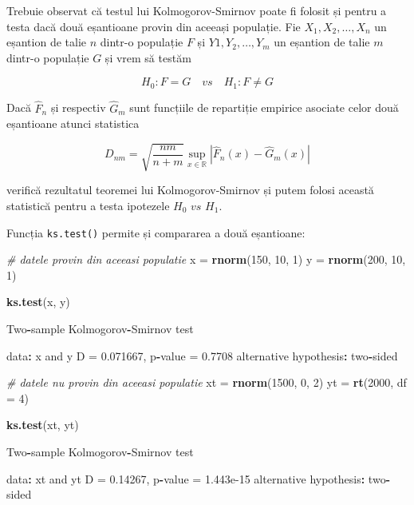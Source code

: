 \documentclass[]{article}
\newenvironment{Shaded}{\begin{snugshade}}{\end{snugshade}}
\newcommand{\KeywordTok}[1]{\textcolor[rgb]{0.13,0.29,0.53}{\textbf{#1}}}
\newcommand{\DataTypeTok}[1]{\textcolor[rgb]{0.13,0.29,0.53}{#1}}
\newcommand{\DecValTok}[1]{\textcolor[rgb]{0.00,0.00,0.81}{#1}}
\newcommand{\FloatTok}[1]{\textcolor[rgb]{0.00,0.00,0.81}{#1}}
\newcommand{\StringTok}[1]{\textcolor[rgb]{0.31,0.60,0.02}{#1}}
\newcommand{\CommentTok}[1]{\textcolor[rgb]{0.56,0.35,0.01}{\textit{#1}}}
\newcommand{\OperatorTok}[1]{\textcolor[rgb]{0.81,0.36,0.00}{\textbf{#1}}}
\newcommand{\NormalTok}[1]{#1}
\begin{document}
Trebuie observat că testul lui Kolmogorov-Smirnov poate fi folosit și
pentru a testa dacă două eșantioane provin din aceeași populație. Fie
\(X_1, X_2, \ldots, X_n\) un eșantion de talie \(n\) dintr-o populație
\(F\) și \(Y1, Y_2, \ldots, Y_m\) un eșantion de talie \(m\) dintr-o
populație \(G\) și vrem să testăm

\[
  H_0: F = G \quad vs\quad H_1: F\neq G
\]

Dacă \(\hat{F}_n\) și respectiv \(\hat{G}_m\) sunt funcțiile de
repartiție empirice asociate celor două eșantioane atunci statistica

\[
  D_{nm} = \sqrt{\frac{nm}{n+m}}\sup_{x\in\mathbb{R}}\left|\hat{F}_n(x) - \hat{G}_m(x)\right|
\]

verifică rezultatul teoremei lui Kolmogorov-Smirnov și putem folosi
această statistică pentru a testa ipotezele \(H_0\,\, vs\,\, H_1\).

Funcția \texttt{ks.test()} permite și compararea a două eșantioane:

\begin{Shaded}
\begin{Highlighting}[]
\CommentTok{# datele provin din aceeasi populatie}
\NormalTok{x =}\StringTok{ }\KeywordTok{rnorm}\NormalTok{(}\DecValTok{150}\NormalTok{, }\DecValTok{10}\NormalTok{, }\DecValTok{1}\NormalTok{)}
\NormalTok{y =}\StringTok{ }\KeywordTok{rnorm}\NormalTok{(}\DecValTok{200}\NormalTok{, }\DecValTok{10}\NormalTok{, }\DecValTok{1}\NormalTok{)}

\KeywordTok{ks.test}\NormalTok{(x, y)}

\NormalTok{    Two}\OperatorTok{-}\NormalTok{sample Kolmogorov}\OperatorTok{-}\NormalTok{Smirnov test}

\NormalTok{data}\OperatorTok{:}\StringTok{  }\NormalTok{x and y}
\NormalTok{D =}\StringTok{ }\FloatTok{0.071667}\NormalTok{, p}\OperatorTok{-}\NormalTok{value =}\StringTok{ }\FloatTok{0.7708}
\NormalTok{alternative hypothesis}\OperatorTok{:}\StringTok{ }\NormalTok{two}\OperatorTok{-}\NormalTok{sided}

\CommentTok{# datele nu provin din aceeasi populatie}
\NormalTok{xt =}\StringTok{ }\KeywordTok{rnorm}\NormalTok{(}\DecValTok{1500}\NormalTok{, }\DecValTok{0}\NormalTok{, }\DecValTok{2}\NormalTok{)}
\NormalTok{yt =}\StringTok{ }\KeywordTok{rt}\NormalTok{(}\DecValTok{2000}\NormalTok{, }\DataTypeTok{df =} \DecValTok{4}\NormalTok{)}

\KeywordTok{ks.test}\NormalTok{(xt, yt)}

\NormalTok{    Two}\OperatorTok{-}\NormalTok{sample Kolmogorov}\OperatorTok{-}\NormalTok{Smirnov test}

\NormalTok{data}\OperatorTok{:}\StringTok{  }\NormalTok{xt and yt}
\NormalTok{D =}\StringTok{ }\FloatTok{0.14267}\NormalTok{, p}\OperatorTok{-}\NormalTok{value =}\StringTok{ }\FloatTok{1.443e-15}
\NormalTok{alternative hypothesis}\OperatorTok{:}\StringTok{ }\NormalTok{two}\OperatorTok{-}\NormalTok{sided}
\end{Highlighting}
\end{Shaded}
\end{document}
